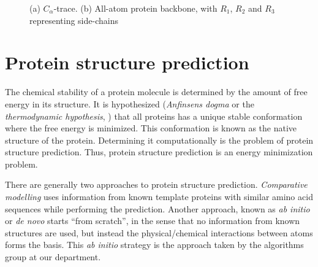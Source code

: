 

\begin{figure}
  \centering
  \caption{(a) $C_{\alpha}$-trace. (b) All-atom protein backbone, with $R_1$, $R_2$ and $R_3$ representing side-chains}
\end{figure}

\section{Protein structure prediction}
The chemical stability of a protein molecule is determined by the
amount of free energy in its structure. It is hypothesized
(\textit{Anfinsens dogma} or the \textit{thermodynamic hypothesis},
\cite{anfinsen73, soundararajan2010}) that all proteins has a unique
stable conformation where the free energy is minimized. This
conformation is known as the native structure of the
protein. Determining it computationally is the problem of protein
structure prediction. Thus, protein structure prediction is an energy
minimization problem.


There are generally two approaches to protein structure prediction.
\textit{Comparative modelling} uses information from known template
proteins with similar amino acid sequences while performing the
prediction. Another approach, known as \textit{ab initio} or
\textit{de novo} starts ``from scratch'', in the sense that no
information from known structures are used, but instead the
physical/chemical interactions between atoms forms the basis. This
\textit{ab initio} strategy is the approach taken by the algorithms
group at our department.

